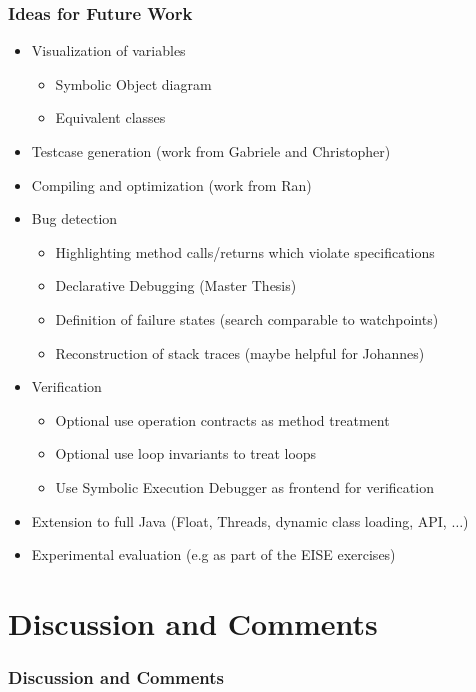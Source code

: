\documentclass[accentcolor=tud9d,colorbacktitle,inverttitle,landscape,english,presentation,t]{tudbeamer}
\begin{document}
   \begin{frame}[t]
		\frametitle{Ideas for Future Work}
      
      \begin{itemize}
         \item Visualization of variables
               \begin{itemize}
                  \item Symbolic Object diagram
                  \item Equivalent classes
               \end{itemize}
         \item Testcase generation (work from Gabriele and Christopher)
         \item Compiling and optimization (work from Ran)
         \item Bug detection
               \begin{itemize}
                  \item Highlighting method calls/returns which violate specifications
                  \item Declarative Debugging (Master Thesis)
                  \item Definition of failure states (search comparable to watchpoints)
                  \item Reconstruction of stack traces (maybe helpful for Johannes)
               \end{itemize}
         \item Verification
               \begin{itemize}
                  \item Optional use operation contracts as method treatment
                  \item Optional use loop invariants to treat loops
                  \item Use Symbolic Execution Debugger as frontend for verification
               \end{itemize}
         \item Extension to full Java (Float, Threads, dynamic class loading, API, $\dots$)
         \item Experimental evaluation (e.g as part of the EISE exercises)
      \end{itemize}
	\end{frame}
   
\section{Discussion and Comments}
   
   \begin{frame}[t]
		\frametitle{Discussion and Comments}
	\end{frame}
\end{document}
